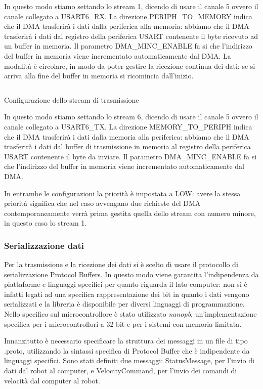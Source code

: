 In questo modo stiamo settando lo stream 1, dicendo di usare il canale 5 ovvero il canale collegato a USART6\_RX. La direzione PERIPH\_TO\_MEMORY indica che il DMA trasferirà i dati dalla periferica alla memoria: abbiamo che il DMA trasferirà i dati dal registro della periferica USART contenente il byte ricevuto ad un buffer in memoria. Il parametro DMA\_MINC\_ENABLE fa si che l'indirizzo del buffer in memoria viene incrementato automaticamente dal DMA. 
La modalità è circolare, in modo da poter gestire la ricezione continua dei dati: se si arriva alla fine del buffer in memoria si ricomincia dall'inizio.

\begin{listing}[H]
\inputminted[frame=single,framesep=10pt]{c}{codice/dma2_tx_config.c}
\caption{Configurazione dello stream di trasmissione}
\label{listing:DMA_tx_config}
\end{listing}

In questo modo stiamo settando lo stream 6, dicendo di usare il canale 5 ovvero il canale collegato a USART6\_TX. La direzione MEMORY\_TO\_PERIPH indica che il DMA trasferirà i dati dalla memoria alla periferica: abbiamo che il DMA trasferirà i dati dal buffer di trasmissione in memoria al registro della periferica USART contenente il byte da inviare. Il parametro DMA\_MINC\_ENABLE fa si che l'indirizzo del buffer in memoria viene incrementato automaticamente dal DMA. 

In entrambe le configurazioni la priorità è impostata a LOW: avere la stessa priorità significa che nel caso avvengano due richieste del DMA contemporaneamente verrà prima gestita quella dello stream con numero minore, in questo caso lo stream 1.

\subsubsection{Serializzazione dati}
Per la trasmissione e la ricezione dei dati si è scelto di usare il protocollo di serializzazione Protocol Buffers. In questo modo viene garantita l'indipendenza da piattaforme e linguaggi specifici per quanto riguarda il lato computer: non si è infatti legati ad una specifica rappresentazione dei bit 
in quanto i dati vengono serializzati e la libreria è disponibile per diversi linguaggi di programmazione. Nello specifico sul microcontrollore è stato utilizzato \textit{nanopb}, un'implementazione specifica per i microcontrollori a 32 bit e per i sistemi con memoria limitata.

Innanzitutto è necessario specificare la struttura dei messaggi in un file di tipo .proto, utilizzando la sintassi specifica di Protocol Buffer che è indipendente da linguaggi specifici. Sono stati definiti due messaggi: StatusMessage, per l'invio di dati dal robot al computer, e VelocityCommand, per l'invio dei comandi di velocità dal computer al robot.

